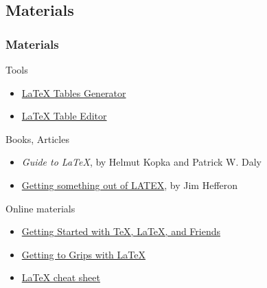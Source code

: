 \documentclass[slidestop,compress,mathserif]{beamer}
\begin{document}

\subsection[Materials]{Materials}
\begin{frame} 
		\frametitle{Materials}

		Tools
		\begin{itemize}
			\item \href{http://www.tablesgenerator.com/latex_tables}{LaTeX Tables Generator}
			\item \href{http://truben.no/table/}{LaTeX Table Editor}
		\end{itemize}
		
		Books, Articles
		\begin{itemize}
			\item \emph{Guide to LaTeX}, by Helmut Kopka and Patrick W. Daly
			\item \href{http://mirror.physik-pool.tu-berlin.de/tex-archive/info/first-latex-doc/first-latex-doc.pdf}{Getting something out of LATEX}, by Jim Hef­feron
		\end{itemize}				
		
		Online materials
		\begin{itemize}
			\item \href{https://www.tug.org/begin.html}{Getting Started with TeX, LaTeX, and Friends}
			\item \href{http://www.andy-roberts.net/writing/latexl}{Getting to Grips with LaTeX}
			\item \href{http://wch.github.io/latexsheet/}{LaTeX cheat sheet}
		\end{itemize}				
		
\end{frame}
\end{document}
